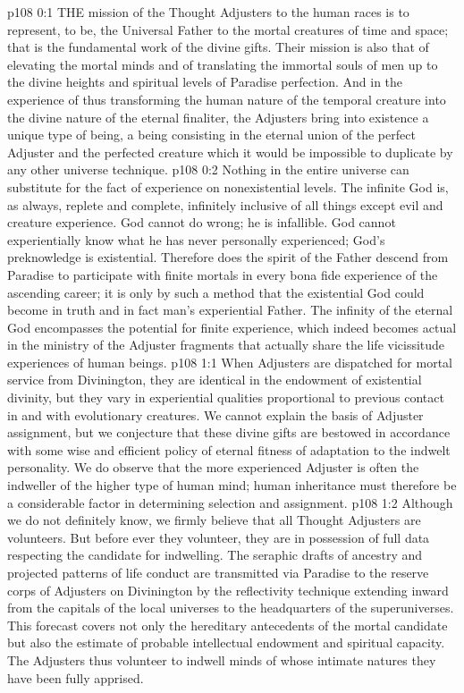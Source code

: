 \vs p108 0:1 THE mission of the Thought Adjusters to the human races is to represent, to be, the Universal Father to the mortal creatures of time and space; that is the fundamental work of the divine gifts. Their mission is also that of elevating the mortal minds and of translating the immortal souls of men up to the divine heights and spiritual levels of Paradise perfection. And in the experience of thus transforming the human nature of the temporal creature into the divine nature of the eternal finaliter, the Adjusters bring into existence a unique type of being, a being consisting in the eternal union of the perfect Adjuster and the perfected creature which it would be impossible to duplicate by any other universe technique.
\vs p108 0:2 \pc Nothing in the entire universe can substitute for the fact of experience on nonexistential levels. The infinite God is, as always, replete and complete, infinitely inclusive of all things except evil and creature experience. God cannot do wrong; he is infallible. God cannot experientially know what he has never personally experienced; God’s preknowledge is existential. Therefore does the spirit of the Father descend from Paradise to participate with finite mortals in every bona fide experience of the ascending career; it is only by such a method that the existential God could become in truth and in fact man’s experiential Father. The infinity of the eternal God encompasses the potential for finite experience, which indeed becomes actual in the ministry of the Adjuster fragments that actually share the life vicissitude experiences of human beings.
\vs p108 1:1 When Adjusters are dispatched for mortal service from Divinington, they are identical in the endowment of existential divinity, but they vary in experiential qualities proportional to previous contact in and with evolutionary creatures. We cannot explain the basis of Adjuster assignment, but we conjecture that these divine gifts are bestowed in accordance with some wise and efficient policy of eternal fitness of adaptation to the indwelt personality. We do observe that the more experienced Adjuster is often the indweller of the higher type of human mind; human inheritance must therefore be a considerable factor in determining selection and assignment.
\vs p108 1:2 Although we do not definitely know, we firmly believe that all Thought Adjusters are volunteers. But before ever they volunteer, they are in possession of full data respecting the candidate for indwelling. The seraphic drafts of ancestry and projected patterns of life conduct are transmitted via Paradise to the reserve corps of Adjusters on Divinington by the reflectivity technique extending inward from the capitals of the local universes to the headquarters of the superuniverses. This forecast covers not only the hereditary antecedents of the mortal candidate but also the estimate of probable intellectual endowment and spiritual capacity. The Adjusters thus volunteer to indwell minds of whose intimate natures they have been fully apprised.
